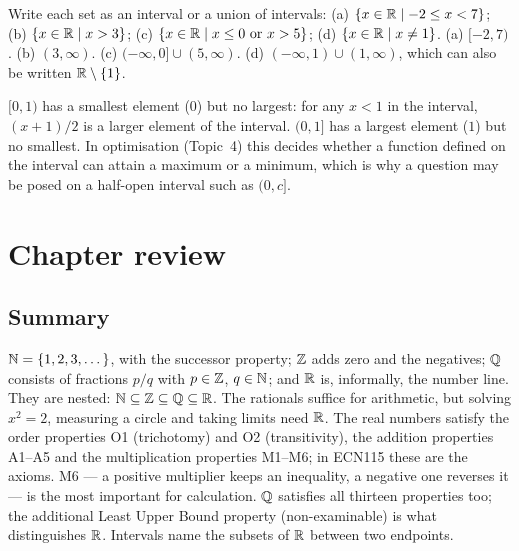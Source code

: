 \begin{example}
Write each set as an interval or a union of intervals: (a) $\{x\in\mathbb{R}\mid -2\le x<7\}$;
(b) $\{x\in\mathbb{R}\mid x>3\}$; (c) $\{x\in\mathbb{R}\mid x\le 0\text{ or }x>5\}$; (d) $\{x\in\mathbb{R}\mid x\ne 1\}$.
\solution
(a) $[-2,7)$. (b) $(3,\infty)$. (c) $(-\infty,0]\cup(5,\infty)$. (d) $(-\infty,1)\cup(1,\infty)$, which can also be
written $\mathbb{R}\setminus\{1\}$.
\end{example}

\begin{external}
$[0,1)$ has a smallest element ($0$) but no largest: for any $x<1$ in the interval, $(x+1)/2$ is a larger element
of the interval. $(0,1]$ has a largest element ($1$) but no smallest. In optimisation (Topic~4) this decides
whether a function defined on the interval can attain a maximum or a minimum, which is why a question may be
posed on a half-open interval such as $(0,c]$.
\end{external}

\section{Chapter review}
\subsection*{Summary}
$\mathbb{N}=\{1,2,3,\dots\}$, with the successor property; $\mathbb{Z}$ adds zero and the negatives; $\mathbb{Q}$ consists of fractions
$p/q$ with $p\in\mathbb{Z}$, $q\in\mathbb{N}$; and $\mathbb{R}$ is, informally, the number line. They are nested:
$\mathbb{N}\subseteq\mathbb{Z}\subseteq\mathbb{Q}\subseteq\mathbb{R}$. The rationals suffice for arithmetic, but solving $x^2=2$, measuring a
circle and taking limits need $\mathbb{R}$. The real numbers satisfy the order properties O1 (trichotomy) and O2
(transitivity), the addition properties A1--A5 and the multiplication properties M1--M6; in ECN115 these are
the axioms. M6 --- a positive multiplier keeps an inequality, a negative one reverses it --- is the most
important for calculation. $\mathbb{Q}$ satisfies all thirteen properties too; the additional Least Upper Bound property
(non-examinable) is what distinguishes $\mathbb{R}$. Intervals name the subsets of $\mathbb{R}$ between two endpoints.

